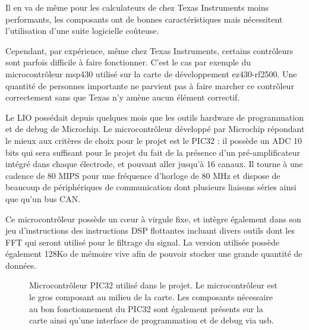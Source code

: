 \documentclass[letterpaper, twoside, 12pt, memoire, creativecommons, hyperref]{thETS}
\begin{document}
Il en va de même pour les calculateurs de chez Texas Instruments moins performants, les composants ont de bonnes caractéristiques mais nécessitent l'utilisation d'une suite logicielle coûteuse. 

Cependant, par expérience, même chez Texas Instruments, certains contrôleurs sont parfois difficile à faire fonctionner. C'est le cas par exemple du microcontrôleur msp430 utilisé sur la carte de développement ez430-rf2500. Une quantité de personnes importante ne parvient pas à faire marcher ce contrôleur correctement sans que Texas n'y amène aucun élément correctif.

Le LIO possédait depuis quelques mois que les outils hardware de programmation et de debug de Microchip. Le microcontrôleur développé par Microchip répondant le mieux aux critères de choix pour le projet est le PIC32 : il possède un ADC 10 bits qui sera suffisant pour le projet du fait de la présence d'un pré-amplificateur intégré dans chaque électrode, et pouvant aller jusqu’à 16 canaux. Il tourne à une cadence de 80 MIPS pour une fréquence d'horloge de 80 MHz et dispose de beaucoup de périphériques de communication dont plusieurs liaisons séries ainsi que qu’un bus CAN. 

Ce microcontrôleur possède un cœur à virgule fixe, et intègre également dans son jeu d'instructions des instructions DSP flottantes incluant divers outils dont les FFT qui seront utilisé pour le filtrage du signal. La version utilisée possède également 128Ko de mémoire vive afin de pouvoir stocker une grande quantité de données.

\begin{figure}
	\centering
	\caption{Microcontrôleur PIC32 utilisé dans le projet. Le microcontrôleur est le gros composant au milieu de la carte. Les composants nécessaire au bon fonctionnement du PIC32 sont également présents sur la carte ainsi qu'une interface de programmation et de debug via usb.}
	\label{fig:pic32}
\end{figure}
\end{document}
